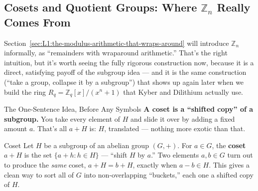 \subsection{Cosets and Quotient Groups: Where \texorpdfstring{$\mathbb{Z}_n$}{Z\_n} Really Comes From}
\label{sec:L1:cosets-and-quotient-groups-where-really}

Section~\ref{sec:L1:the-modulus-arithmetic-that-wraps-around} will introduce $\mathbb{Z}_n$ informally, as ``remainders with wraparound arithmetic.'' That's the right intuition, but it's worth seeing the fully rigorous construction now, because it is a direct, satisfying payoff of the subgroup idea --- and it is the same construction (``take a group, collapse it by a subgroup'') that shows up again later when we build the ring $R_q = \mathbb{Z}_q[x]/(x^n+1)$ that Kyber and Dilithium actually use.

\begin{rmkbox}{The One-Sentence Idea, Before Any Symbols}
\textbf{A coset is a ``shifted copy'' of a subgroup.} You take every element of $H$ and slide it over by adding a fixed amount $a$. That's all $a+H$ is: $H$, translated --- nothing more exotic than that.
\end{rmkbox}

\begin{defbox}{Coset}
Let $H$ be a subgroup of an abelian group $(G,+)$. For $a \in G$, the \textbf{coset} $a + H$ is the set $\{a + h : h \in H\}$ --- ``shift $H$ by $a$.'' Two elements $a,b \in G$ turn out to produce the \emph{same} coset, $a+H = b+H$, exactly when $a - b \in H$. This gives a clean way to sort all of $G$ into non-overlapping ``buckets,'' each one a shifted copy of $H$.
\end{defbox}

